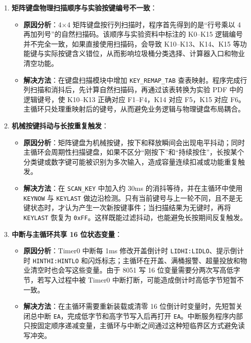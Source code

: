 \documentclass[12pt,a4paper]{article}
\begin{document}
\begin{enumerate}
    \item \textbf{矩阵键盘物理扫描顺序与实验按键编号不一致}：
    \begin{itemize}
        \item \textbf{原因分析}：4$\times$4 矩阵键盘按行列扫描时，程序首先得到的是“行号乘以 4 再加列号”的自然扫描码。该顺序与实验资料中标注的 K0--K15 逻辑编号并不完全一致，如果直接使用扫描码，会导致 K10--K13、K14、K15 等功能键与实际按键含义错位，从而影响垃圾桶分类选择、计算器入口和物业清空功能。
        \item \textbf{解决方法}：在键盘扫描模块中增加 \texttt{KEY\_REMAP\_TAB} 查表映射。程序完成行列扫描和消抖后，先计算自然扫描码，再通过该表转换为实验 PDF 中的逻辑键号，使 K10--K13 正确对应 F1--F4，K14 对应 F5，K15 对应 F6。主循环只处理重映射后的键号，从而避免业务逻辑与物理键盘布局耦合。
    \end{itemize}

    \item \textbf{机械按键抖动与长按重复触发}：
    \begin{itemize}
        \item \textbf{原因分析}：矩阵键盘为机械按键，按下和释放瞬间会出现电平抖动；同时主循环会周期性扫描键盘，如果不区分“刚按下”和“持续按住”，长按某个分类键或数字键可能被识别为多次输入，造成容量连续扣减或功能重复触发。
        \item \textbf{解决方法}：在 \texttt{SCAN\_KEY} 中加入约 30ms 的消抖等待，并在主循环中使用 \texttt{KEYNOW} 与 \texttt{KEYLAST} 做边沿检测。只有当前键号与上一轮不同，且不是无键状态时，才认为产生一次新按键事件；当扫描结果为无键时，再将 \texttt{KEYLAST} 恢复为 \texttt{0xFF}。这样既能过滤抖动，也能避免长按期间反复触发。
    \end{itemize}

    \item \textbf{中断与主循环共享 16 位状态变量}：
    \begin{itemize}
        \item \textbf{原因分析}：Timer0 中断每 1ms 修改开盖倒计时 \texttt{LIDHI:LIDLO}、提示倒计时 \texttt{HINTHI:HINTLO} 和闪烁标志；主循环在开盖、满桶报警、超量投放和物业清空时也会写这些变量。由于 8051 写 16 位变量需要分两次写高低字节，若写入过程中被 Timer0 中断打断，可能造成倒计时高低字节短暂不一致。
        \item \textbf{解决方法}：在主循环需要重新装载或清零 16 位倒计时变量时，先短暂关闭总中断 \texttt{EA}，完成低字节和高字节写入后再打开 \texttt{EA}。中断服务程序内部只按固定顺序递减变量，主循环与中断之间通过这种短临界区方式避免读写冲突。
    \end{itemize}


\end{enumerate}
\end{document}
